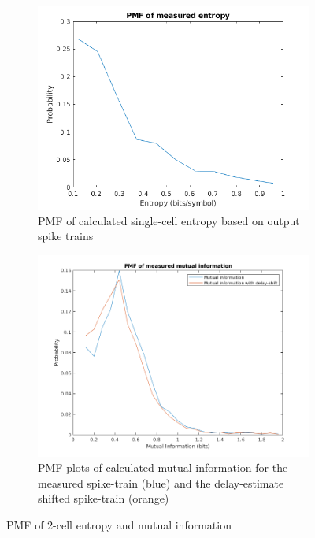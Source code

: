 \begin{figure}

\centering
\begin{subfigure}[b]{0.9\textwidth}
    \includegraphics[width=1.0\textwidth]{05-Results/entropyPmf.png}
    \caption{PMF of calculated single-cell entropy based on output spike trains}
    \label{fig:cellEntPmf}
\end{subfigure}

\begin{subfigure}[b]{0.9\textwidth}
    \includegraphics[width=1.0\textwidth]{05-Results/mutualInfo_pmf.png}
    \caption{PMF plots of calculated mutual information for the measured spike-train (blue) and the delay-estimate shifted spike-train (orange)}
    \label{fig:mutualInfoPmf}
\end{subfigure}
\caption{PMF of 2-cell entropy and mutual information}
\end{figure}


